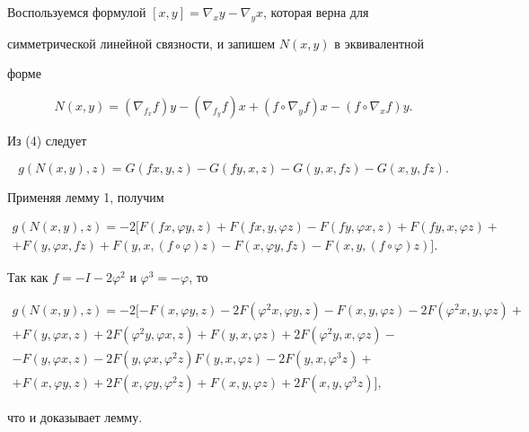  


\begin{pf} 


Воспользуемся формулой $[x,y]=\nabla_x y-\nabla_y x$, которая верна для 


симметрической линейной связности, и запишем $N(x,y)$ в эквивалентной 


форме 


$$ 


N(x,y)=(\nabla_{f_x}f)y-(\nabla_{f_y}f)x+ 


(f\circ\nabla_y f)x-(f\circ \nabla_x f)y. 


$$ 


Из (4) следует


$$ 


g(N(x,y),z)=G(f x,y,z)-G(f y,x,z)-G(y,x,f z)-G(x,y,f z). 


$$ 


Применяя лемму 1, получим 


\begin{multline*} 


g(N(x,y),z)=-2[F(f x,\varphi y,z)+F(f x,y,\varphi z)- 


F(f y,\varphi x,z)+F(f y,x,\varphi z)+ \\ 


+F(y,\varphi x,f z)+F(y,x,(f\circ\varphi)z)- 


F(x,\varphi y,f z)-F(x,y,(f\circ\varphi)z)]. 


\end{multline*} 


Так как $f=-I-2\varphi^2$ и $\varphi^3=-\varphi$, то 


\begin{multline*} 


g(N(x,y),z)=-2[-F(x,\varphi y,z)-2F(\varphi ^2x,\varphi y,z) 


-F(x,y,\varphi z)-2F(\varphi ^2x,y,\varphi z)+ \\ 


% 


+F(y,\varphi x,z)+2F(\varphi ^2y,\varphi x,z)+ 


F(y,x,\varphi z)+2F(\varphi ^2y,x,\varphi z)- \\ 


% 


-F(y,\varphi x,z)-2F(y,\varphi x,\varphi ^2z)F(y,x,\varphi z)- 


2F(y,x,\varphi ^3z)+ \\ 


% 


+F(x,\varphi y,z)+2F(x,\varphi y,\varphi ^2z)+ 


F(x,y,\varphi z)+2F(x,y,\varphi ^3z)], 


\end{multline*} 


что и доказывает лемму. 


\end{pf} 



